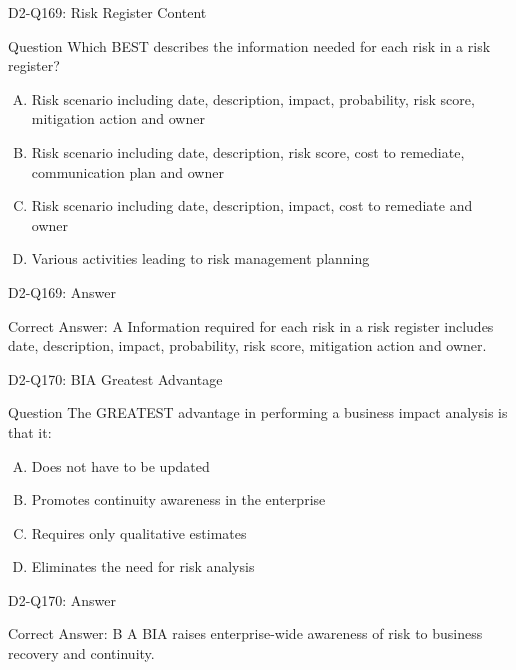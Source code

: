\documentclass{beamer}
\begin{document}
	\begin{frame}{D2-Q169: Risk Register Content}
		\begin{block}{Question}
			Which BEST describes the information needed for each risk in a risk register?
		\end{block}
		\begin{enumerate}[(A)]
			\item Risk scenario including date, description, impact, probability, risk score, mitigation action and owner
			\item Risk scenario including date, description, risk score, cost to remediate, communication plan and owner
			\item Risk scenario including date, description, impact, cost to remediate and owner
			\item Various activities leading to risk management planning
		\end{enumerate}
	\end{frame}
	\begin{frame}{D2-Q169: Answer}
		\begin{block}{Correct Answer: A}
			Information required for each risk in a risk register includes date, description, impact, probability, risk score, mitigation action and owner.
		\end{block}
	\end{frame}
	
	\begin{frame}{D2-Q170: BIA Greatest Advantage}
		\begin{block}{Question}
			The GREATEST advantage in performing a business impact analysis is that it:
		\end{block}
		\begin{enumerate}[(A)]
			\item Does not have to be updated
			\item Promotes continuity awareness in the enterprise
			\item Requires only qualitative estimates
			\item Eliminates the need for risk analysis
		\end{enumerate}
	\end{frame}
	\begin{frame}{D2-Q170: Answer}
		\begin{block}{Correct Answer: B}
			A BIA raises enterprise-wide awareness of risk to business recovery and continuity.
		\end{block}
	\end{frame}
	
\end{document}
